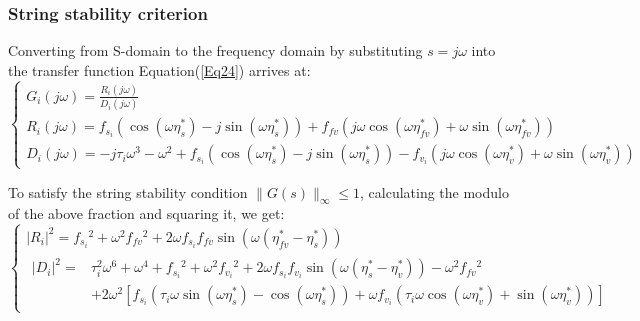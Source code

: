\documentclass[a4paper]{cas-sc}
\begin{document}
\subsubsection{String stability criterion}
\label{Section 4.3.2}

Converting from S-domain to the frequency domain by substituting $s=j\omega$ into the transfer function Equation(\ref{Eq24}) arrives at:
\begin{equation}
  \left\{\begin{array}{l}
    G_{i}(j \omega)=\frac{R_{i}(j \omega)}{D_{i}(j \omega)}                                                                                                                                                                                 \\
    R_{i}(j \omega)=f_{s_{i}}\left(\cos \left(\omega \eta_{s}^{*}\right)-j \sin \left(\omega \eta_{s}^{*}\right)\right)+f_{f v}\left(j \omega \cos \left(\omega \eta_{f v}^{*}\right)+\omega \sin \left(\omega \eta_{f v}^{*}\right)\right) \\
    D_{i}(j \omega)=-j \tau_{i} \omega^{3}-\omega^{2}+f_{s_{i}}\left(\cos \left(\omega \eta_{s}^{*}\right)-j \sin \left(\omega \eta_{s}^{*}\right)\right)-f_{v_{i}}\left(j \omega \cos \left(\omega \eta_{v}^{*}\right)+\omega \sin \left(\omega \eta_{v}^{*}\right)\right)
  \end{array}\right.
  \label{Eq27}
\end{equation}

To satisfy the string stability condition $\parallel G\left(s\right)\parallel_\infty\le1$, calculating the modulo of the above fraction and squaring it, we get:
\begin{equation}
  \left\{\begin{array}{l}
    \left|R_{i}\right|^{2}=f_{s_{i}}{ }^{2}+\omega^{2} f_{f v}{ }^{2}+2 \omega f_{s_{i}} f_{f v} \sin \left(\omega\left(\eta_{f v}^{*}-\eta_{s}^{*}\right)\right) \\
    \begin{aligned}
      \left|D_{i}\right|^{2}= & \tau_{i}^{2} \omega^{6}+\omega^{4}+f_{s_{i}}{ }^{2}+\omega^{2} f_{v_{i}}{ }^{2}+2 \omega f_{s_{i}} f_{v_{i}} \sin \left(\omega\left(\eta_{s}^{*}-\eta_{v}^{*}\right)\right)-\omega^{2} f_{f v}{ }^{2}                                                                \\
                              & +2 \omega^{2}\left[f_{s_{i}}\left(\tau_{i} \omega \sin \left(\omega \eta_{s}^{*}\right)-\cos \left(\omega \eta_{s}^{*}\right)\right)+\omega f_{v_{i}}\left(\tau_{i} \omega \cos \left(\omega \eta_{v}^{*}\right)+\sin \left(\omega \eta_{v}^{*}\right)\right)\right]
    \end{aligned}
  \end{array}\right.
  \label{Eq28}
\end{equation}
\end{document}
